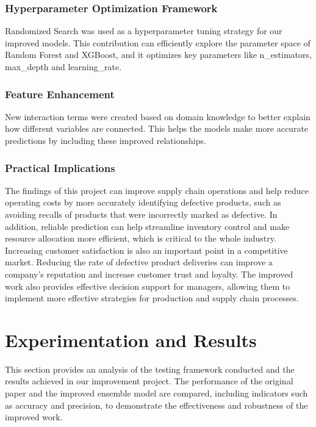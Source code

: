 \documentclass[conference]{IEEEtran}
\begin{document}
\subsubsection{Hyperparameter Optimization Framework}

Randomized Search was used as a hyperparameter tuning strategy for our improved models. This contribution can efficiently explore the parameter space of Random Forest and XGBoost, and it optimizes key parameters like n\_estimators, max\_depth and learning\_rate.




\subsubsection{Feature Enhancement}

New interaction terms were created based on domain knowledge to better explain how different variables are connected. This helps the models make more accurate predictions by including these improved relationships.

\subsubsection{Practical Implications}

The findings of this project can improve supply chain operations and help reduce operating costs by more accurately identifying defective products, such as avoiding recalls of products that were incorrectly marked as defective.
In addition, reliable prediction can help streamline inventory control and make resource allocation more efficient, which is critical to the whole industry.
Increasing customer satisfaction is also an important point in a competitive market. Reducing the rate of defective product deliveries can improve a company's reputation and increase customer trust and loyalty.
The improved work also provides effective decision support for managers, allowing them to implement more effective strategies for production and supply chain processes.


\section{Experimentation and Results}

This section provides an analysis of the testing framework conducted and the results achieved in our improvement project. The performance of the original paper and the improved ensemble model are compared, including indicators such as accuracy and precision, to demonstrate the effectiveness and robustness of the improved work.
\end{document}
